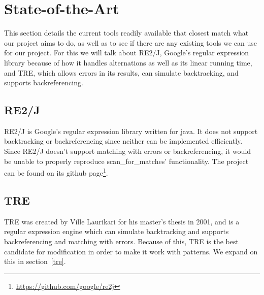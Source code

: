 \section{State-of-the-Art}
This section details the current tools readily available that closest match 
what our project aims to do, as well as to see if there are any existing tools 
we can use for our project. For this we will talk about RE2/J, Google's regular 
expression library because of how it handles alternations as well as its 
linear running time, and TRE, which allows errors in its results, can 
simulate backtracking, and supports backreferencing.
 \subsection{RE2/J} %
 RE2/J is Google's regular expression library written for java. It does not support 
 backtracking or backreferencing since neither can be implemented 
 efficiently. Since RE2/J doesn't support matching with 
 errors or backreferencing, it would be unable to properly reproduce 
 scan\_for\_matches' functionality. The project can be found on its github 
 page\footnote{\url{https://github.com/google/re2j}}.
 \subsection{TRE} %
 TRE was created by Ville Laurikari for his master's thesis in 2001, and 
 is a regular expression engine which can simulate backtracking and supports 
 backreferencing and matching with errors. Because of this, TRE is the best 
 candidate for modification in order to make it work with patterns. 
 We expand on this in section~\ref{tre}.
